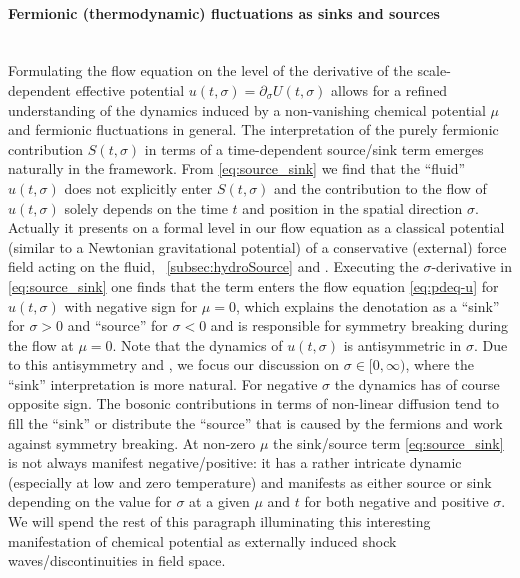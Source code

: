 \paragraph{Fermionic (thermodynamic) fluctuations as sinks and sources}\label{paragraph:chemical_potential_shock_wave}\mbox{}\\%
Formulating the \frg{} flow equation on the level of the derivative of the scale-dependent effective potential $u ( t,  \sigma ) = \partial_\sigma U ( t, \sigma )$ allows for a refined understanding of the dynamics induced by a non-vanishing chemical potential $\mu$ and fermionic fluctuations in general.
The interpretation of the purely fermionic contribution $S ( t, \sigma )$ in terms of a time-dependent source/sink term emerges naturally in the \cfd{} framework.
From \cref{eq:source_sink} we find that the ``fluid'' $u( t, \sigma )$ does not explicitly enter $S ( t, \sigma )$ and the contribution to the flow of $u( t, \sigma )$ solely depends on the time $t$ and position in the spatial direction $\sigma$.
Actually it presents on a formal level in our flow equation as a classical potential (similar to a Newtonian gravitational potential) of a conservative (external) force field acting on the fluid, \cf{}\ \cref{subsec:hydroSource} and .
Executing the $\sigma$-derivative in \cref{eq:source_sink} one finds that the term enters the flow equation \eqref{eq:pdeq-u} for $u( t, \sigma )$ with negative sign for $\mu=0$, which explains the denotation as a ``sink'' for $\sigma > 0$ and ``source'' for $\sigma < 0$ and is responsible for symmetry breaking during the flow at $\mu = 0$.
Note that the dynamics of $u ( t, \sigma )$ is antisymmetric in $\sigma$.
Due to this antisymmetry and \wlogA{}, we focus our discussion on $\sigma \in [ 0, \infty )$, where the ``sink'' interpretation is more natural. For negative $\sigma$ the dynamics has of course opposite sign.
The bosonic contributions in terms of non-linear diffusion tend to fill the ``sink'' or distribute the ``source'' that is caused by the fermions and work against symmetry breaking.
At non-zero $\mu$ the sink/source term \eqref{eq:source_sink} is not always manifest negative/positive: it has a rather intricate dynamic (especially at low and zero temperature) and manifests as either source or sink depending on the value for $\sigma$ at a given $\mu$ and $t$ for both \dash{} negative and positive $\sigma$.
We will spend the rest of this paragraph illuminating this interesting manifestation of chemical potential as externally induced shock waves/discontinuities in field space.
